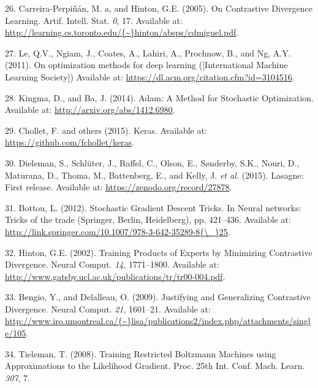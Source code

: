 \documentclass[12pt,a4paper,twoside]{book}
\theoremstyle{definition}
\theoremstyle{definition}
\theoremstyle{remark}
\begin{document}
\hypertarget{ref-Carreira-Perpinan2005}{}
26. Carreira-Perpiñán, M. a, and Hinton, G.E. (2005). On Contrastive
Divergence Learning. Artif. Intell. Stat. \emph{0}, 17. Available at:
\href{http://learning.cs.toronto.edu/\%7B~\%7Dhinton/absps/cdmiguel.pdf}{http://learning.cs.toronto.edu/\{\textasciitilde{}\}hinton/absps/cdmiguel.pdf}.

\hypertarget{ref-Le2011}{}
27. Le, Q.V., Ngiam, J., Coates, A., Lahiri, A., Prochnow, B., and Ng,
A.Y. (2011). On optimization methods for deep learning ({[}International
Machine Learning Society{]}) Available at:
\url{https://dl.acm.org/citation.cfm?id=3104516}.

\hypertarget{ref-Kingma2014}{}
28. Kingma, D., and Ba, J. (2014). Adam: A Method for Stochastic
Optimization. Available at: \url{http://arxiv.org/abs/1412.6980}.

\hypertarget{ref-Chollet2015}{}
29. Chollet, F. and others (2015). Keras. Available at:
\url{https://github.com/fchollet/keras}.

\hypertarget{ref-Dieleman2015}{}
30. Dieleman, S., Schlüter, J., Raffel, C., Olson, E., Sønderby, S.K.,
Nouri, D., Maturana, D., Thoma, M., Battenberg, E., and Kelly, J.
\emph{et al.} (2015). Lasagne: First release. Available at:
\url{https://zenodo.org/record/27878}.

\hypertarget{ref-Bottou2012}{}
31. Bottou, L. (2012). Stochastic Gradient Descent Tricks. In Neural
networks: Tricks of the trade (Springer, Berlin, Heidelberg), pp.
421--436. Available at:
\href{http://link.springer.com/10.1007/978-3-642-35289-8\%7B/_\%7D25}{http://link.springer.com/10.1007/978-3-642-35289-8\{\textbackslash{}\_\}25}.

\hypertarget{ref-Hinton2002}{}
32. Hinton, G.E. (2002). Training Products of Experts by Minimizing
Contrastive Divergence. Neural Comput. \emph{14}, 1771--1800. Available
at: \url{http://www.gatsby.ucl.ac.uk/publications/tr/tr00-004.pdf}.

\hypertarget{ref-Bengio2009}{}
33. Bengio, Y., and Delalleau, O. (2009). Justifying and Generalizing
Contrastive Divergence. Neural Comput. \emph{21}, 1601--21. Available
at:
\href{http://www.iro.umontreal.ca/\%7B~\%7Dlisa/publications2/index.php/attachments/single/105}{http://www.iro.umontreal.ca/\{\textasciitilde{}\}lisa/publications2/index.php/attachments/single/105}.

\hypertarget{ref-Tieleman2008}{}
34. Tieleman, T. (2008). Training Restricted Boltzmann Machines using
Approximations to the Likelihood Gradient. Proc. 25th Int. Conf. Mach.
Learn. \emph{307}, 7.
\end{document}
